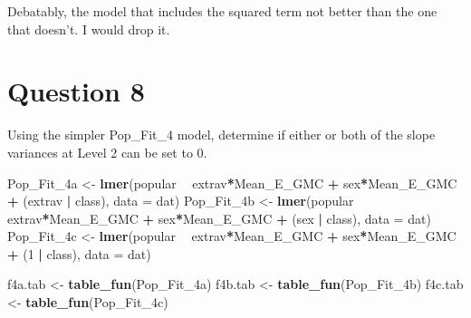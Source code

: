 \documentclass[]{article}
\newenvironment{Shaded}{\begin{snugshade}}{\end{snugshade}}
\newcommand{\KeywordTok}[1]{\textcolor[rgb]{0.13,0.29,0.53}{\textbf{#1}}}
\newcommand{\DataTypeTok}[1]{\textcolor[rgb]{0.13,0.29,0.53}{#1}}
\newcommand{\DecValTok}[1]{\textcolor[rgb]{0.00,0.00,0.81}{#1}}
\newcommand{\StringTok}[1]{\textcolor[rgb]{0.31,0.60,0.02}{#1}}
\newcommand{\OperatorTok}[1]{\textcolor[rgb]{0.81,0.36,0.00}{\textbf{#1}}}
\newcommand{\NormalTok}[1]{#1}
\begin{document}
Debatably, the model that includes the squared term not better than the
one that doesn't. I would drop it.

\section{Question 8}\label{question-8}

Using the simpler Pop\_Fit\_4 model, determine if either or both of the
slope variances at Level 2 can be set to 0.

\begin{Shaded}
\begin{Highlighting}[]
\NormalTok{Pop_Fit_4a <-}\StringTok{ }\KeywordTok{lmer}\NormalTok{(popular }\OperatorTok{~}\StringTok{ }\NormalTok{extrav}\OperatorTok{*}\NormalTok{Mean_E_GMC }\OperatorTok{+}\StringTok{ }\NormalTok{sex}\OperatorTok{*}\NormalTok{Mean_E_GMC }\OperatorTok{+}\StringTok{ }\NormalTok{(extrav }\OperatorTok{|}\StringTok{ }\NormalTok{class), }\DataTypeTok{data =}\NormalTok{ dat)}
\NormalTok{Pop_Fit_4b <-}\StringTok{ }\KeywordTok{lmer}\NormalTok{(popular }\OperatorTok{~}\StringTok{ }\NormalTok{extrav}\OperatorTok{*}\NormalTok{Mean_E_GMC }\OperatorTok{+}\StringTok{ }\NormalTok{sex}\OperatorTok{*}\NormalTok{Mean_E_GMC }\OperatorTok{+}\StringTok{ }\NormalTok{(sex }\OperatorTok{|}\StringTok{ }\NormalTok{class), }\DataTypeTok{data =}\NormalTok{ dat)}
\NormalTok{Pop_Fit_4c <-}\StringTok{ }\KeywordTok{lmer}\NormalTok{(popular }\OperatorTok{~}\StringTok{ }\NormalTok{extrav}\OperatorTok{*}\NormalTok{Mean_E_GMC }\OperatorTok{+}\StringTok{ }\NormalTok{sex}\OperatorTok{*}\NormalTok{Mean_E_GMC }\OperatorTok{+}\StringTok{ }\NormalTok{(}\DecValTok{1} \OperatorTok{|}\StringTok{ }\NormalTok{class), }\DataTypeTok{data =}\NormalTok{ dat)}

\NormalTok{f4a.tab <-}\StringTok{ }\KeywordTok{table_fun}\NormalTok{(Pop_Fit_4a)}
\NormalTok{f4b.tab <-}\StringTok{ }\KeywordTok{table_fun}\NormalTok{(Pop_Fit_4b)}
\NormalTok{f4c.tab <-}\StringTok{ }\KeywordTok{table_fun}\NormalTok{(Pop_Fit_4c)}


\end{Highlighting}
\end{Shaded}
\end{document}
